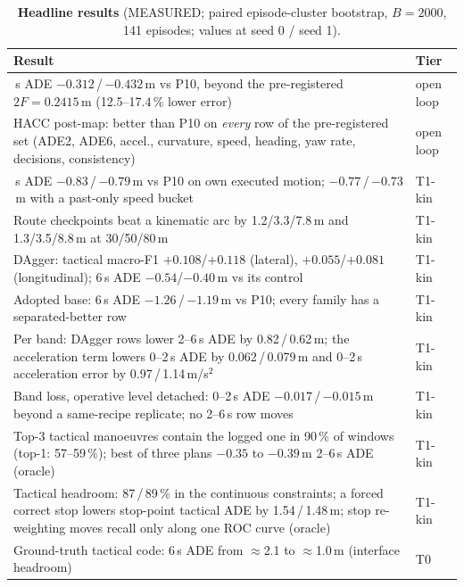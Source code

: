 \documentclass[10pt,twocolumn]{article}
\theoremstyle{remark}
\begin{document}
\begin{table}[t]
\centering
\caption{\textbf{Headline results} (MEASURED; paired episode-cluster bootstrap, $B=2000$, 141 episodes; values at seed 0 / seed 1).}
\label{tab:headline}
\small
\begin{tabularx}{\columnwidth}{@{}>{\raggedright\arraybackslash}Xl@{}}
\toprule
Result & Tier \\
\midrule
6\,s ADE $-0.312$\,/\,$-0.432$\,m vs P10, beyond the pre-registered $2F=0.2415$\,m (12.5--17.4\,\% lower error) & open loop \\
HACC post-map: better than P10 on \emph{every} row of the pre-registered set (ADE2, ADE6, accel., curvature, speed, heading, yaw rate, decisions, consistency) & open loop \\
6\,s ADE $-0.83$\,/\,$-0.79$\,m vs P10 on own executed motion; $-0.77$\,/\,$-0.73$\,m with a past-only speed bucket & T1-kin \\
Route checkpoints beat a kinematic arc by 1.2/3.3/7.8\,m and 1.3/3.5/8.8\,m at 30/50/80\,m & T1-kin \\
DAgger: tactical macro-F1 $+0.108$/$+0.118$ (lateral), $+0.055$/$+0.081$ (longitudinal); 6\,s ADE $-0.54$/$-0.40$\,m vs its control & T1-kin \\
Adopted base: 6\,s ADE $-1.26$\,/\,$-1.19$\,m vs P10; every family has a separated-better row & T1-kin \\
Per band: DAgger rows lower 2--6\,s ADE by 0.82\,/\,0.62\,m; the acceleration term lowers 0--2\,s ADE by 0.062\,/\,0.079\,m and 0--2\,s acceleration error by 0.97\,/\,1.14\,m/s$^2$ & T1-kin \\
Band loss, operative level detached: 0--2\,s ADE $-0.017$\,/\,$-0.015$\,m beyond a same-recipe replicate; no 2--6\,s row moves & T1-kin \\
Top-3 tactical manoeuvres contain the logged one in 90\,\% of windows (top-1: 57--59\,\%); best of three plans $-0.35$ to $-0.39$\,m 2--6\,s ADE (oracle) & T1-kin \\
Tactical headroom: 87\,/\,89\,\% in the continuous constraints; a forced correct stop lowers stop-point tactical ADE by 1.54\,/\,1.48\,m; stop re-weighting moves recall only along one ROC curve (oracle) & T1-kin \\
Ground-truth tactical code: 6\,s ADE from $\approx$2.1 to $\approx$1.0\,m (interface headroom) & T0 \\
\bottomrule
\end{tabularx}
\end{table}
\end{document}
